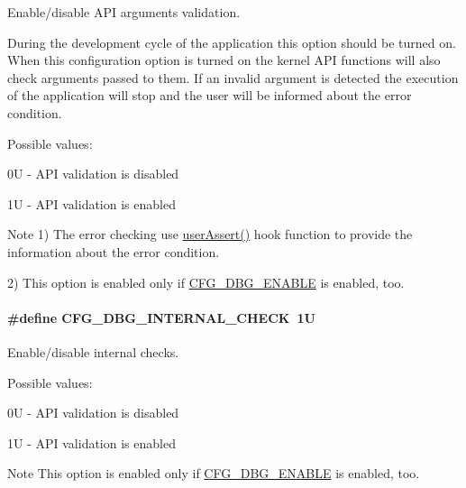 Enable/disable A\-P\-I arguments validation. 

During the development cycle of the application this option should be turned on. When this configuration option is turned on the kernel A\-P\-I functions will also check arguments passed to them. If an invalid argument is detected the execution of the application will stop and the user will be informed about the error condition.

Possible values\-:
\begin{DoxyItemize}
\item 0\-U -\/ A\-P\-I validation is disabled
\item 1\-U -\/ A\-P\-I validation is enabled
\end{DoxyItemize}

\begin{DoxyNote}{Note}
1) The error checking use \hyperlink{group__dbg__intf_gaeffe9bfb4bdcfe9d824bfa4686cc969e}{user\-Assert()} hook function to provide the information about the error condition. 

2) This option is enabled only if \hyperlink{group__dbg__cfg_ga2ee37a5fa7efdba7d0014328e6c623a8}{C\-F\-G\-\_\-\-D\-B\-G\-\_\-\-E\-N\-A\-B\-L\-E} is enabled, too. 
\end{DoxyNote}
\hypertarget{group__template__dbg__cfg_ga530daa344716eca7cf87075dd7a8fca1}{
\paragraph[{C\-F\-G\-\_\-\-D\-B\-G\-\_\-\-I\-N\-T\-E\-R\-N\-A\-L\-\_\-\-C\-H\-E\-C\-K}]{\setlength{\rightskip}{0pt plus 5cm}\#define C\-F\-G\-\_\-\-D\-B\-G\-\_\-\-I\-N\-T\-E\-R\-N\-A\-L\-\_\-\-C\-H\-E\-C\-K~1\-U}}\label{group__template__dbg__cfg_ga530daa344716eca7cf87075dd7a8fca1}


Enable/disable internal checks. 

Possible values\-:
\begin{DoxyItemize}
\item 0\-U -\/ A\-P\-I validation is disabled
\item 1\-U -\/ A\-P\-I validation is enabled \begin{DoxyNote}{Note}
This option is enabled only if \hyperlink{group__dbg__cfg_ga2ee37a5fa7efdba7d0014328e6c623a8}{C\-F\-G\-\_\-\-D\-B\-G\-\_\-\-E\-N\-A\-B\-L\-E} is enabled, too. 
\end{DoxyNote}

\end{DoxyItemize}